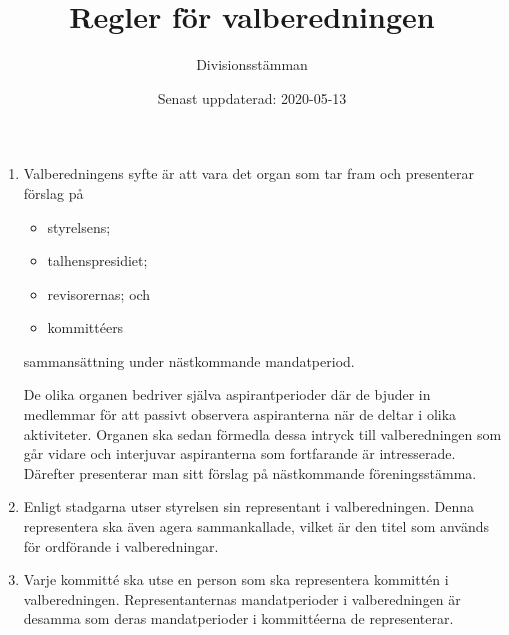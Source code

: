 \documentclass{dvd}
\begin{document}
	\title{Regler för valberedningen}
	\author{Divisionsstämman}
	\date{Senast uppdaterad: 2020-05-13}

    \begin{enumerate}[label=\arabic* §, ref=\arabic*]
        \item Valberedningens syfte är att vara det organ som tar fram och presenterar förslag på

		\begin{itemize}
			\item styrelsens;
			\item talhenspresidiet;
			\item revisorernas; och
			\item kommittéers
		\end{itemize}

		sammansättning under nästkommande mandatperiod.

		De olika organen bedriver själva aspirantperioder där de bjuder in medlemmar för att passivt observera aspiranterna när de deltar i olika aktiviteter.
		Organen ska sedan förmedla dessa intryck till valberedningen som går vidare och interjuvar aspiranterna som fortfarande är intresserade.
		Därefter presenterar man sitt förslag på nästkommande föreningsstämma.

        \item Enligt stadgarna utser styrelsen sin representant i valberedningen.
		Denna representera ska även agera sammankallade, vilket är den titel som används för ordförande i valberedningar.

        \item Varje kommitté ska utse en person som ska representera kommittén i valberedningen.
		Representanternas mandatperioder i valberedningen är desamma som deras mandatperioder i kommittéerna de representerar.
    \end{enumerate}
\end{document}
